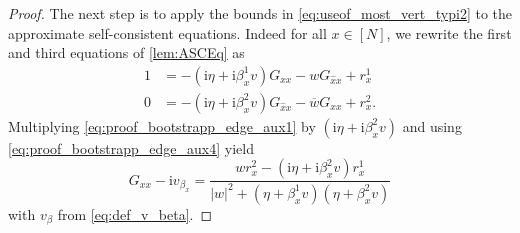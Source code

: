\documentclass[10pt,a4paper]{amsart}
\newcommand{\ii}{\mathrm{i}}
\newcommand{\abs}[1]{\left| #1 \right|}
\numberwithin{equation}{section}
\newcommand*\barr[1]{\overline{#1}}
\newcommand*\ubarr[1]{{\widehat{#1}}}
\begin{document}
\begin{proof}
		The next step is to apply the bounds in \eqref{eq:useof_most_vert_typi2} to the approximate self-consistent equations. Indeed for all $x \in [N]$, we rewrite the first and third equations of \cref{lem:ASCEq} as 
		\begin{align}
			1&= - (\ii \eta + \ii \beta_{x}^1 v) G_{xx} - w G_{\ubarr{x}x} + r_{x}^1 \label{eq:proof_bootstrapp_edge_aux1} \\
			0 &= - (\ii \eta + \ii \beta_{x}^2 v) G_{\ubarr{x}x} - \barr{w} G_{xx} + r_{x}^2. 
			\label{eq:proof_bootstrapp_edge_aux4} 
		\end{align}
		Multiplying \eqref{eq:proof_bootstrapp_edge_aux1} by $(\ii \eta + \ii \beta_{x}^2 v)$ and using \eqref{eq:proof_bootstrapp_edge_aux4} yield 
		\begin{equation}\label{eq:equal_Gxx-vbeta}
			G_{xx} - \ii v_{\beta_x} = \frac{ w r_{x}^2 - (\ii\eta +\ii \beta_x^2 v) r_{x}^1}{\abs{w}^2 + (\eta + \beta_{x}^1 v)(\eta + \beta_{x}^2v)}
		\end{equation}
		with $v_{\beta}$ from \eqref{eq:def_v_beta}. 
		

\end{proof}
\end{document}
